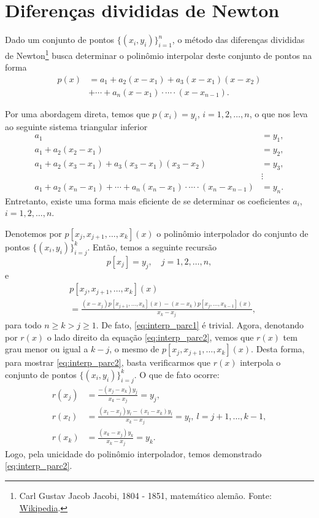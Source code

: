 \emconstrucao

\section{Diferenças divididas de Newton}\label{cap_interp_difdiv}

Dado um conjunto de pontos $\{(x_i, y_i)\}_{i=1}^n$, o método das diferenças divididas de Newton\footnote{Carl Gustav Jacob Jacobi, 1804 - 1851, matemático alemão. Fonte: \href{https://en.wikipedia.org/wiki/Carl_Gustav_Jacob_Jacobi}{Wikipedia}.} busca determinar o polinômio interpolar deste conjunto de pontos na forma
\begin{align}
  p(x) &= a_1 + a_2(x-x_1) + a_3(x-x_1)(x-x_2)\\
       &+ \cdots + a_{n}(x-x_1)\cdot \cdots \cdot (x-x_{n-1}).
\end{align}

Por uma abordagem direta, temos que $p(x_i)=y_i$, $i=1, 2, \dotsc, n$, o que nos leva ao seguinte sistema triangular inferior
\begin{align}
  a_1 &= y_1, \\
  a_1 + a_2(x_2-x_1) &= y_2, \\
  a_1 + a_2(x_3-x_1) + a_3(x_3-x_1)(x_3-x_2) &= y_3, \\
  &\vdots\\
  a_1 + a_2(x_n-x_1) + \cdots + a_{n}(x_n-x_1)\cdot\cdots\cdot(x_n-x_{n-1}) &= y_n.
\end{align}
Entretanto, existe uma forma mais eficiente de se determinar os coeficientes $a_i$, $i=1, 2, \dotsc, n$.

Denotemos por $p[x_j, x_{j+1}, \dotsc, x_{k}](x)$ o polinômio interpolador do conjunto de pontos $\{(x_i, y_i)\}_{i=j}^k$. Então, temos a seguinte recursão
\begin{equation} \label{eq:interp_parc1}
  p[x_j] = y_j,\quad j=1, 2, \dotsc, n,
\end{equation}
e
\begin{align}
  &p[x_j, x_{j+1}, \ldots, x_k](x) \nonumber\\
  &= \frac{(x-x_j)p[x_{j+1},\dotsc,x_k](x)-(x-x_k)p[x_j,\dotsc,x_{k-1}](x)}{x_k-x_j},\label{eq:interp_parc2}
\end{align}
para todo $n\geq k > j \geq 1$. De fato, \eqref{eq:interp_parc1} é trivial. Agora, denotando por $r(x)$ o lado direito da equação \eqref{eq:interp_parc2}, vemos que $r(x)$ tem grau menor ou igual a $k-j$, o mesmo de $p[x_j, x_{j+1}, \ldots, x_k](x)$. Desta forma, para mostrar \eqref{eq:interp_parc2}, basta verificarmos que $r(x)$ interpola o conjunto de pontos $\{(x_i, y_i)\}_{i=j}^k$. O que de fato ocorre:
\begin{align}
  r(x_j) &= \frac{-(x_j-x_k)y_j}{x_k-x_j} = y_j,\\
  r(x_{l}) &= \frac{(x_l-x_j)y_l-(x_l-x_k)y_l}{x_k-x_j}=y_l,~l=j+1,\dotsc,k-1,\\
  r(x_k) &= \frac{(x_k-x_j)y_k}{x_k-x_j}=y_k.
\end{align}
Logo, pela unicidade do polinômio interpolador, temos demonstrado \eqref{eq:interp_parc2}.

